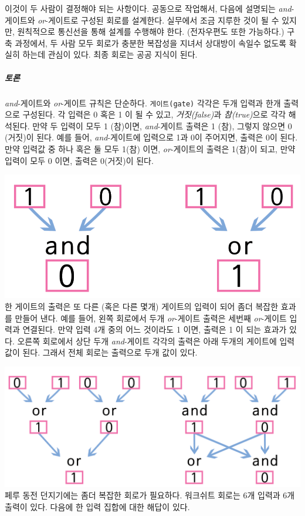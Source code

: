 \documentclass[]{article}
\begin{document}
이것이 두 사람이 결정해야 되는 사항이다. 공동으로 작업해서, 다음에
설명되는 \emph{and}-게이트와 \emph{or}-게이트로 구성된 회로를 설계한다.
실무에서 조금 지루한 것이 될 수 있지만, 원칙적으로 통신선을 통해 설계를
수행해야 한다. (전자우편도 또한 가능하다.) 구축 과정에서, 두 사람 모두
회로가 충분한 복잡성을 지녀서 상대방이 속일수 없도록 확실히 하는데
관심이 있다. 최종 회로는 공공 지식이 된다.

\subparagraph{토론}\label{section-241}

\emph{and}-게이트와 \emph{or}-게이트 규칙은 단순하다.
\texttt{게이트(gate)} 각각은 두개 입력과 한개 출력으로 구성된다. 각
입력은 0 혹은 1 이 될 수 있고, \emph{거짓(false)}과 \emph{참(true)}으로
각각 해석된다. 만약 두 입력이 모두 1 (참)이면, \emph{and}-게이트 출력은
1 (참), 그렇지 않으면 0 (거짓)이 된다. 예를 들어, \emph{and}-게이트에
입력으로 1과 0이 주어지면, 출력은 0이 된다. 만약 입력값 중 하나 혹은 둘
모두 1(참) 이면, \emph{or}-게이트의 출력은 1(참)이 되고, 만약 입력이
모두 0 이면, 출력은 0(거짓)이 된다.

\includegraphics{csunplugged/05-part/img/ch18-crypto/17-crypto-02-and-or-gates.png}
한 게이트의 출력은 또 다른 (혹은 다른 몇개) 게이트의 입력이 되어 좀더
복잡한 효과를 만들어 낸다. 예를 들어, 왼쪽 회로에서 두개
\emph{or}-게이트 출력은 세번째 \emph{or}-게이트 입력과 연결된다. 만약
입력 4개 중의 어느 것이라도 1 이면, 출력은 1 이 되는 효과가 있다. 오른쪽
회로에서 상단 두개 \emph{and}-게이트 각각의 출력은 아래 두개의 게이트에
입력값이 된다. 그래서 전체 회로는 출력으로 두개 값이 있다.

\includegraphics{csunplugged/05-part/img/ch18-crypto/17-crypto-03-and-or-gates.png}
페루 동전 던지기에는 좀더 복잡한 회로가 필요하다. 워크쉬트 회로는 6개
입력과 6개 출력이 있다. 다음에 한 입력 집합에 대한 해답이 있다.
\end{document}
